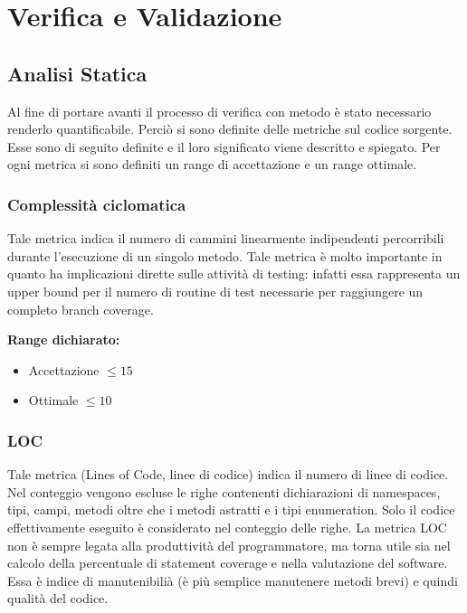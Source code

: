 \chapter{Verifica e Validazione} %

\label{Capitolo5} %


\section{Analisi Statica}
Al fine di portare avanti il processo di verifica con metodo è stato necessario renderlo
quantificabile. Perciò si sono definite delle metriche sul codice sorgente. Esse sono
di seguito definite e il loro significato viene descritto e spiegato. Per ogni metrica si
sono definiti un range di accettazione e un range ottimale.

\subsection{Complessità ciclomatica}

Tale metrica indica il numero di cammini linearmente indipendenti percorribili durante
l'esecuzione di un singolo metodo. Tale metrica è molto importante in quanto ha
implicazioni dirette sulle attività di testing: infatti essa rappresenta un upper bound
per il numero di routine di test necessarie per raggiungere un completo branch coverage.

\textbf{Range dichiarato:}
\begin{itemize}
\item Accettazione $\leq 15$
\item Ottimale $\leq 10$
\end{itemize}

\subsection{LOC}

Tale metrica (Lines of Code, linee di codice) indica il numero di linee di codice. Nel conteggio vengono escluse le righe contenenti dichiarazioni di namespaces, tipi, campi, metodi oltre che i metodi astratti e i tipi enumeration.
Solo il codice effettivamente eseguito è considerato nel conteggio delle righe.
La metrica LOC non è sempre legata alla produttività del programmatore, ma torna
utile sia nel calcolo della percentuale di statement coverage e nella valutazione del
software.
Essa è indice di manutenibilià (è più semplice manutenere metodi brevi) e quindi
qualità del codice.

